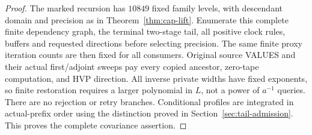 \documentclass[11pt]{article}
\numberwithin{equation}{section}
\theoremstyle{remark}\newtheorem{remark}[theorem]{Remark}
\begin{document}
\begin{proof}
The marked recursion has $10849$ fixed family levels, with
descendant domain and precision as in Theorem~\ref{thm:cap-lift}.
Enumerate this complete finite dependency graph, the terminal
two-stage tail, all positive clock rules, buffers and requested
directions before selecting precision. The same finite proxy
iteration counts are then fixed for all consumers. Original
source VALUES and their actual first/adjoint sweeps pay every
copied ancestor, zero-tape computation, and HVP direction.
All inverse private widths have fixed exponents, so finite
restoration requires a larger polynomial in $L$, not a power
of $a^{-1}$ queries. There are no rejection or retry branches.
Conditional profiles are integrated in actual-prefix order using
the distinction proved in Section~\ref{sec:tail-admission}.
This proves the complete covariance assertion.
\end{proof}
\end{document}
